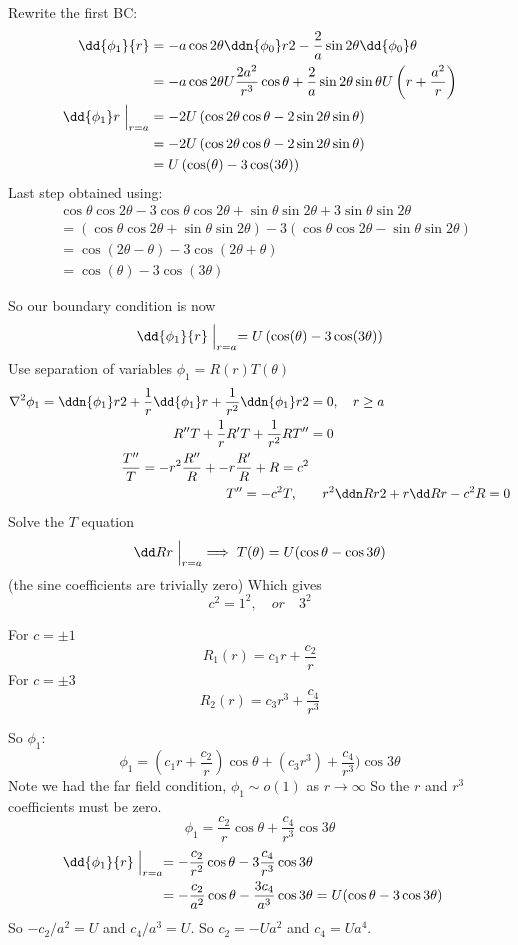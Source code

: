 \documentclass{X:/Documents/Coding/Latex/myassignment}
\begin{document}
Rewrite the first BC:
\begin{align*}
    \dd{\phi_1}{r} &= - a\cos2\theta \ddn{\phi_0}r2 - \frac2a \sin2\theta \dd{\phi_0}\theta\\
    &= -a\cos2\theta  U\frac{2a^2}{r^3}\cos\theta + \frac2a \sin2\theta \sin\theta U\left(r + \frac{a^2}{r}\right)\\
    \dd{\phi_1}r \Bigm|_{r=a} &= -2U \left(\cos2\theta \cos\theta - 2\sin2\theta \sin\theta\right)\\
    &= -2U \left(\cos2\theta \cos\theta - 2\sin2\theta \sin\theta\right)\\
    &= U \left(\cos(\theta) - 3\cos(3\theta)\right)
\end{align*}
Last step obtained using:
\begin{align*}
    &\cos\theta \cos2\theta - 3\cos\theta \cos2\theta + \sin\theta \sin 2\theta +3\sin\theta \sin 2\theta\\
    &=\left(\cos\theta \cos2\theta + \sin\theta\sin2\theta \right) -3 \left(\cos\theta \cos2\theta - \sin\theta\sin2\theta\right)\\
    &= \cos(2\theta -\theta) -3 \cos(2\theta + \theta)\\
    &= \cos(\theta) - 3\cos(3\theta)
\end{align*}

So our boundary condition is now
\[\dd{\phi_1}{r}\Bigm|_{r=a} = U \left(\cos(\theta) - 3\cos(3\theta)\right)\]
Use separation of variables $\phi_1 = R(r) T(\theta)$
\begin{align*}
    \nabla^2 \phi_1 = \ddn{\phi_1}r2 + \frac1r \dd{\phi_1}r + \frac1{r^2} \ddn{\phi_1}r2 &=0, \quad r\geq a\\
    R'' T + \frac1r R'T + \frac1{r^2} RT'' &= 0\\
    \frac{T''}{T} = -r^2 \frac{R''}{R} + -r \frac{R'}{R} + R = c^2\\
    T'' = -c^2 T ,\quad & \quad r^2 \ddn Rr2 + r\dd Rr - c^2 R = 0
\end{align*}
Solve the $T$ equation
\[\dd Rr\Bigm|_{r=a} \implies T(\theta) = U(\cos\theta - \cos 3\theta)\]
(the sine coefficients are trivially zero)
Which gives
\[c^2 = 1^2 , \quad or \quad 3^2\]

For $c=\pm 1$
\[R_1(r) = c_1 r + \frac{c_2}r\]
For $c=\pm3$
\[R_2(r) = c_3 r^3 + \frac{c_4}{r^3}\]

So $\phi_1$:
\[\phi_1 = (c_1 r + \frac{c_2}r) \cos\theta + (c_3 r^3) + \frac{c_4}{r^3}) \cos3\theta\]
Note we had the far field condition, $\phi_1 \sim o(1)$ as $r\to \infty$ So the $r$ and $r^3$ coefficients must be zero.
\[\phi_1 = \frac{c_2}{r} \cos\theta + \frac{c_4}{r^3} \cos3\theta\]
\begin{align*}
    \dd{\phi_1}{r} \Bigm|_{r=a} = -\frac{c_2}{r^2}\cos\theta - 3\frac{c_4}{r^3}\cos3\theta\\
    = -\frac{c_2}{a^2} \cos\theta - \frac{3c_4}{a^3} \cos3\theta &=U(\cos\theta - 3\cos3\theta)
\end{align*}
So $-c_2/a^2 = U$ and $c_4/a^3 = U$. So $c_2 = -Ua^2$ and $c_4 = Ua^4$.
\end{document}
